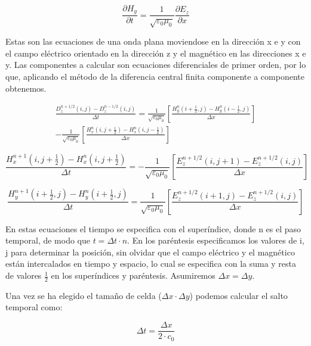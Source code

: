 \documentclass[11pt,a4paper,twoside,pdf]{article}
\numberwithin{equation}{section}
\begin{document}
\begin{equation}
\frac{\partial H_{y}}{\partial t}=\frac{1}{\sqrt{\varepsilon_{0}\mu_{0}}}\frac{\partial E_{z}}{\partial x}
\end{equation}

Estas son las ecuaciones de una onda plana moviendose en la dirección x e y con el campo eléctrico orientado en la dirección z y el magnético en las direcciones x e y. Las componentes a calcular son ecuaciones diferenciales de primer orden, por lo que, aplicando el método de la diferencia central finita componente a componente obtenemos.

\begin{equation}
\begin{split}
\frac{D^{n+1/2}_{z}(i,j)-D^{n-1/2}_{z}(i,j)}{\Delta t}=\frac{1}{\sqrt{\varepsilon_{0}\mu_{0}}}\left[\frac{H^{n}_{y}(i+\frac{1}{2},j)-H^{n}_{y}(i-\frac{1}{2},j)}{\Delta x}\right]  \\
-\frac{1}{\sqrt{\varepsilon_{0}\mu_{0}}}\left[\frac{H^{n}_{x}(i,j+\frac{1}{2})-H^{n}_{x}(i,j-\frac{1}{2})}{\Delta x}\right] 
\end{split}
\end{equation}

\begin{equation}
\frac{H^{n+1}_{x}(i,j+\frac{1}{2})-H^{n}_{x}(i,j+\frac{1}{2})}{\Delta t}=-\frac{1}{\sqrt{\varepsilon_{0}\mu_{0}}}\left[\frac{E^{n+1/2}_{z}(i,j+1)-E^{n+1/2}_{z}(i,j)}{\Delta x}\right] 
\end{equation}

\begin{equation} 
\frac{H^{n+1}_{y}(i+\frac{1}{2},j)-H^{n}_{y}(i+\frac{1}{2},j)}{\Delta t}=\frac{1}{\sqrt{\varepsilon_{0}\mu_{0}}}\left[\frac{E^{n+1/2}_{z}(i+1,j)-E^{n+1/2}_{z}(i,j)}{\Delta x}\right] 
\end{equation}

En estas ecuaciones el tiempo se especifica con el superíndice, donde n es el paso temporal, de modo que $t=\Delta t\cdot n$. En los paréntesis especificamos los valores de i, j para determinar la posición, sin olvidar que el campo eléctrico y el magnético están intercalados en tiempo y espacio, lo cual se especifica con la suma y resta de valores $\frac{1}{2}$ en los superíndices y paréntesis. 
Asumiremos $\Delta x = \Delta y$.

Una vez se ha elegido el tamaño de celda ($\Delta x \cdot \Delta y$) podemos calcular el salto temporal como:

\begin{equation}
\Delta t=\frac{\Delta x}{2 \cdot c_{0}}
\end{equation}
\end{document}

